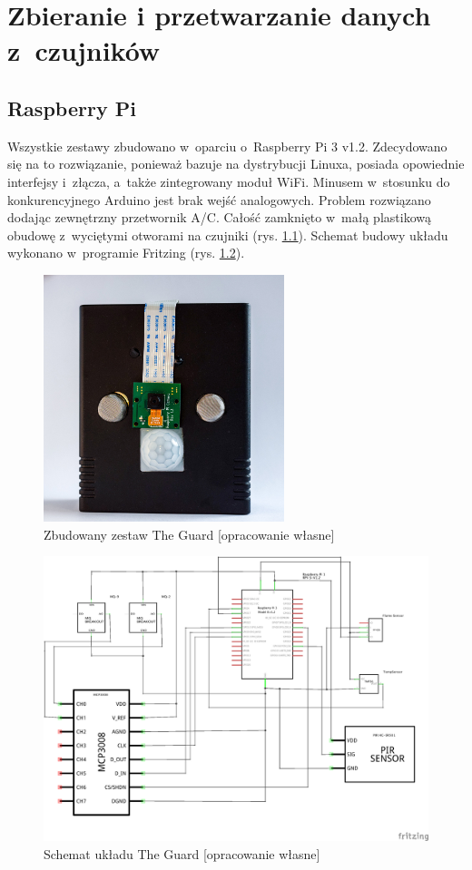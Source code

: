 \chapter{Zbieranie i przetwarzanie danych z~czujników}
\section{Raspberry Pi}
Wszystkie zestawy zbudowano w~oparciu o~Raspberry Pi 3 v1.2. Zdecydowano się na to rozwiązanie, ponieważ bazuje na dystrybucji Linuxa, posiada opowiednie interfejsy i~złącza, a~także zintegrowany moduł WiFi. Minusem w~stosunku do konkurencyjnego Arduino jest brak wejść analogowych. Problem rozwiązano dodając zewnętrzny przetwornik A/C. Całość zamknięto w~małą plastikową obudowę z~wyciętymi otworami na czujniki (rys. \ref{the_guard_set}). Schemat budowy układu wykonano w~programie Fritzing (rys. \ref{the_guard_schem}).
\begin{figure}[H]
	\centering
	\includegraphics[width=7cm]{guard.jpg}
	\caption{Zbudowany zestaw The Guard [opracowanie własne]}
	\label{the_guard_set}
\end{figure}
\begin{figure}[H]
	\centering
	\includegraphics[width=15cm]{GuardSchem}
	\caption{Schemat układu The Guard [opracowanie własne]}
	\label{the_guard_schem}
\end{figure}
